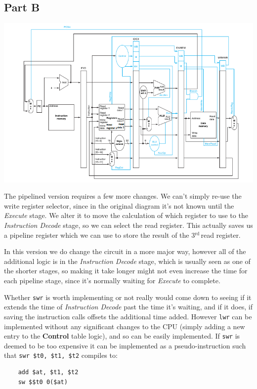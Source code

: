 \documentclass[11pt]{article} %
\newcommand{\strong}[1]{\textbf{#1}}
\newcommand{\code}[1]{\texttt{#1}}
\newcommand{\rd}{$^{\text{rd}\ }$}
\begin{document}
\subsection{Part B}

\includegraphics[width=\textwidth]{pipelineCPU4.png}

The pipelined version requires a few more changes. We can't simply re-use the write register selector, since in the original diagram it's not known until the \emph{Execute} stage. We alter it to move the calculation of which register to use to the \emph{Instruction Decode} stage, so we can select the read register. This actually saves us a pipeline register which we can use to store the result of the 3\rd read register.

In this version we do change the circuit in a more major way, however all of the additional logic is in the \emph{Instruction Decode} stage, which is usually seen as one of the shorter stages, so making it take longer might not even increase the time for each pipeline stage, since it's normally waiting for \emph{Execute} to complete.

Whether \code{swr} is worth implementing or not really would come down to seeing if it extends the time of \emph{Instruction Decode} past the time it's waiting, and if it does, if saving the instruction calls offsets the additional time added. However \code{lwr} can be implemented without any significant changes to the CPU (simply adding a new entry to the \strong{Control} table logic), and so can be easily implemented. If \code{swr} is deemed to be too expensive it can be implemented as a pseudo-instruction such that \code{swr \$t0, \$t1, \$t2} compiles to:

\begin{verbatim}
    add $at, $t1, $t2
    sw $$t0 0($at)
\end{verbatim}
\end{document}
